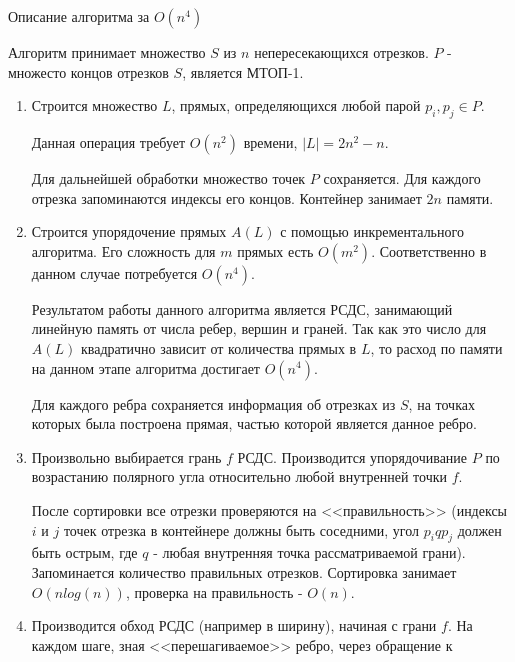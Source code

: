 \documentclass[letterpaper,12pt]{article}
\begin{document}
\begin{center}
Описание алгоритма за $O(n^4)$
\end{center}
\par
Алгоритм принимает множество $S$ из $n$ непересекающихся отрезков.
$P$ - множесто концов отрезков $S$, является МТОП-1.
\begin{enumerate}
      \item Строится множество $L$, прямых, определяющихся любой парой 
            $p_i, p_j \in P$.
            \par
            Данная операция требует $O(n^2)$ времени, $|L| = 2n^2-n$.
            \par
            Для дальнейшей обработки множество точек $P$ сохраняется.
            Для каждого отрезка запоминаются индексы его концов.
            Контейнер занимает $2n$ памяти.
      \item Строится упорядочение прямых $A(L)$ с помощью 
            инкрементального алгоритма. Его сложность для $m$ прямых
            есть $O(m^2)$. Соответственно в данном случае потребуется
            $O(n^4)$.
            \par
            Результатом работы данного алгоритма является РСДС,
            занимающий линейную память от числа ребер, вершин и граней.
            Так как это число для $A(L)$ квадратично зависит от количества
            прямых в $L$, то расход по памяти на данном этапе алгоритма 
            достигает $O(n^4)$.
            \par
            Для каждого ребра сохраняется информация об отрезках из $S$,
            на точках которых была построена прямая, 
            частью которой является данное ребро.
      \item Произвольно выбирается грань $f$ РСДС. Производится 
            упорядочивание $P$ по возрастанию полярного угла относительно 
            любой внутренней точки $f$.
            \par
            После сортировки все отрезки проверяются на <<правильность>> 
            (индексы $i$ и $j$ точек отрезка в контейнере должны быть соседними,
            угол $p_i q p_j$ должен быть острым, где $q$ - любая 
            внутренняя точка рассматриваемой грани). 
            Запоминается количество правильных отрезков. Сортировка занимает 
            $O(nlog(n))$, проверка на правильность - $O(n)$.
      \item Производится обход РСДС (например в ширину), начиная с грани $f$. 
            На каждом шаге, зная <<перешагиваемое>> ребро, через обращение к 

\end{enumerate}
\end{document}
